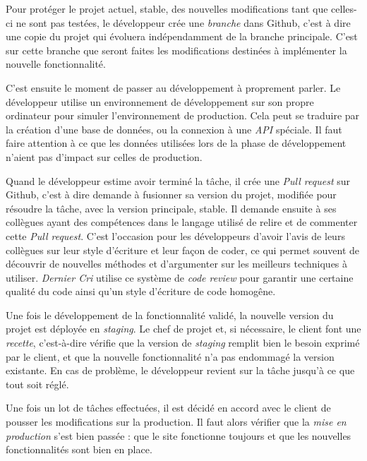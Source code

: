 \documentclass[12pt,a4paper]{article}
\begin{document}
  \bigskip

  Pour protéger le projet actuel, stable, des nouvelles modifications tant
  que celles-ci ne sont pas testées, le développeur crée une
  \emph{branche} dans Github, c'est à dire une copie du projet qui
  évoluera indépendamment de la branche principale. C'est sur cette
  branche que seront faites les modifications destinées à implémenter la
  nouvelle fonctionnalité.

  \bigskip

  C'est ensuite le moment de passer au développement à proprement parler.
  Le développeur utilise un environnement de développement sur son propre
  ordinateur pour simuler l'environnement de production. Cela peut se
  traduire par la création d'une base de données, ou la connexion à une
  \emph{API} spéciale. Il faut faire attention à ce que les données
  utilisées lors de la phase de développement n'aient pas d'impact sur
  celles de production.

  \bigskip

  Quand le développeur estime avoir terminé la tâche, il crée une
  \emph{Pull request} sur Github, c'est à dire demande à fusionner sa
  version du projet, modifiée pour résoudre la tâche, avec la version
  principale, stable. Il demande ensuite à ses collègues ayant des
  compétences dans le langage utilisé de relire et de commenter cette
  \emph{Pull request}. C'est l'occasion pour les développeurs d'avoir
  l'avis de leurs collègues sur leur style d'écriture et leur façon de
  coder, ce qui permet souvent de découvrir de nouvelles méthodes et
  d'argumenter sur les meilleurs techniques à utiliser. \emph{Dernier Cri}
  utilise ce système de \emph{code review} pour garantir une certaine
  qualité du code ainsi qu'un style d'écriture de code homogêne.

  \bigskip

  Une fois le développement de la fonctionnalité validé, la nouvelle
  version du projet est déployée en \emph{staging}. Le chef de projet et,
  si nécessaire, le client font une \emph{recette}, c'est-à-dire vérifie
  que la version de \emph{staging} remplit bien le besoin exprimé par le
  client, et que la nouvelle fonctionnalité n'a pas endommagé la version
  existante. En cas de problème, le développeur revient sur la tâche
  jusqu'à ce que tout soit réglé.

  \bigskip

  Une fois un lot de tâches effectuées, il est décidé en accord avec le
  client de pousser les modifications sur la production. Il faut alors
  vérifier que la \emph{mise en production} s'est bien passée : que le
  site fonctionne toujours et que les nouvelles fonctionnalités sont bien
  en place.
\end{document}
